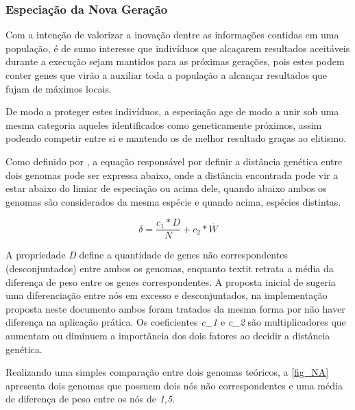 \subsubsection{Especiação da Nova Geração}
Com a intenção de valorizar a inovação dentre as informações contidas em uma população, é de sumo interesse
que indivíduos que alcaçarem resultados aceitáveis durante a execução sejam mantidos para as próximas gerações,
pois estes podem conter genes que virão a auxiliar toda a população a alcançar resultados que fujam de máximos locais.

De modo a proteger estes indivíduos, a especiação age de modo a unir sob uma mesma categoria aqueles
identificados como geneticamente próximos, assim podendo competir entre si e mantendo os de melhor resultado graças ao elitismo.

Como definido por , a equação responsável por definir a
distância genética entre dois genomas pode ser expressa abaixo, onde a distância  encontrada
pode vir a estar abaixo do limiar de especiação ou acima dele, quando abaixo ambos os genomas
são considerados da mesma espécie e quando acima, espécies distintas.

\[ \delta = \frac{c_1 * D}{N} + c_2 * \overline{W}\]

A propriedade \textit{D} define a quantidade de genes não correspondentes
(desconjuntados) entre ambos os genomas, enquanto textit{} retrata
a média da diferença de peso entre os genes correspondentes. A proposta inicial
de  sugeria uma diferenciação entre nós em excesso e
desconjuntados, na implementação proposta neste documento ambos foram tratados da
mesma forma por não haver diferença na aplicação prática. Os coeficientes \textit{c_1}
e \textit{c_2} são multiplicadores que aumentam ou diminuem a importância dos dois fatores
ao decidir a distância genética.

Realizando uma simples comparação entre dois genomas teóricos, a \autoref{fig_NA} apresenta
dois genomas que possuem dois nós não correspondentes e uma média de diferença de peso entre os nós de \textit{1,5}.

